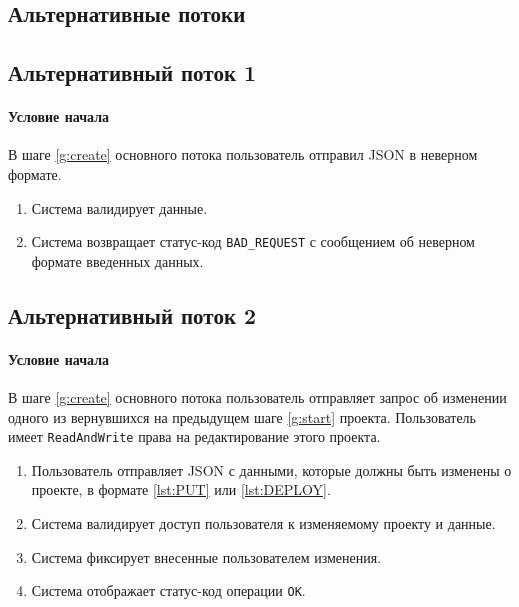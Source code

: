 \documentclass[a4paper,12pt]{article}
\begin{document}
\subsection*{Альтернативные потоки}

\subsection*{Альтернативный поток 1}

\paragraph*{Условие начала} В шаге \ref{g:create} основного потока пользователь отправил JSON в неверном формате.

\begin{enumerate}
    \def\labelenumi{\arabic{enumi}.}
    \item Система валидирует данные.
    \item Система возвращает статус-код \texttt{BAD\_REQUEST} с сообщением об неверном формате введенных данных. 
\end{enumerate}

\subsection*{Альтернативный поток 2}

\paragraph*{Условие начала} В шаге \ref{g:create} основного потока пользователь отправляет запрос об изменении одного из вернувшихся на предыдущем шаге \ref{g:start} проекта. Пользователь имеет \texttt{ReadAndWrite} права на редактирование этого проекта.

\begin{enumerate}
    \def\labelenumi{\arabic{enumi}.}
    \item Пользователь отправляет JSON с данными, которые должны быть изменены о проекте, в формате \ref{lst:PUT} или \ref{lst:DEPLOY}. 
    \item Система валидирует доступ пользователя к изменяемому проекту и данные.
    \item Система фиксирует внесенные пользователем изменения.
    \item Система отображает статус-код операции \texttt{OK}.
\end{enumerate}
\end{document}
